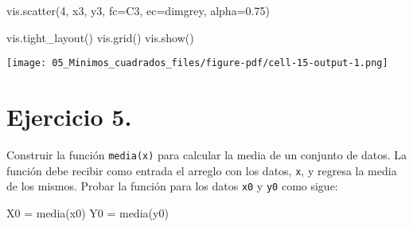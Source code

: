 \documentclass[
  letterpaper,
  DIV=11,
  numbers=noendperiod]{scrreprt}
\newenvironment{Shaded}{\begin{snugshade}}{\end{snugshade}}
\newcommand{\DecValTok}[1]{\textcolor[rgb]{0.68,0.00,0.00}{#1}}
\newcommand{\FloatTok}[1]{\textcolor[rgb]{0.68,0.00,0.00}{#1}}
\newcommand{\NormalTok}[1]{\textcolor[rgb]{0.00,0.23,0.31}{#1}}
\newcommand{\OperatorTok}[1]{\textcolor[rgb]{0.37,0.37,0.37}{#1}}
\newcommand{\StringTok}[1]{\textcolor[rgb]{0.13,0.47,0.30}{#1}}
\begin{document}
\begin{Shaded}
\begin{Highlighting}[]
\NormalTok{vis.scatter(}\DecValTok{4}\NormalTok{, x3, y3, fc}\OperatorTok{=}\StringTok{\textquotesingle{}C3\textquotesingle{}}\NormalTok{, ec}\OperatorTok{=}\StringTok{\textquotesingle{}dimgrey\textquotesingle{}}\NormalTok{, alpha}\OperatorTok{=}\FloatTok{0.75}\NormalTok{)}

\NormalTok{vis.tight\_layout()}
\NormalTok{vis.grid()}
\NormalTok{vis.show()}
\end{Highlighting}
\end{Shaded}

\texttt{[image: 05\_Minimos\_cuadrados\_files/figure-pdf/cell-15-output-1.png]}

\section{\texorpdfstring{\textbf{Ejercicio
5.}}{Ejercicio 5.}}\label{ejercicio-5.}

Construir la función \texttt{media(x)} para calcular la media de un
conjunto de datos. La función debe recibir como entrada el arreglo con
los datos, \texttt{x}, y regresa la media de los mismos. Probar la
función para los datos \texttt{x0} y \texttt{y0} como sigue:

\begin{Shaded}
\begin{Highlighting}[]
\NormalTok{X0 }\OperatorTok{=}\NormalTok{ media(x0)}
\NormalTok{Y0 }\OperatorTok{=}\NormalTok{ media(y0)}
\end{Highlighting}
\end{Shaded}
\end{document}
